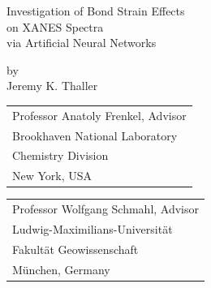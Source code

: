 \documentclass[12pt, oneside]{book}
\begin{document}
\begin{titlepage}
\begin{center}

{\huge Investigation of Bond Strain Effects\\on XANES Spectra\\\vspace{.7em}via Artificial Neural Networks} %

\vspace{2cm}

{\large by\\Jeremy K. Thaller}

\vspace{2cm}


\noindent\begin{tabular}[t]{@{}l}
	Professor Anatoly Frenkel, Advisor\\
	Brookhaven National Laboratory\\
	Chemistry Division \\
	New York, USA
\end{tabular}
\hfill
\begin{tabular}[t]{l@{}}
	Professor Wolfgang Schmahl, Advisor \\
	Ludwig-Maximilians-Universität\\
	Fakultät Geowissenschaft \\
	München, Germany
\end{tabular}


\end{center}
\end{titlepage}
\end{document}
